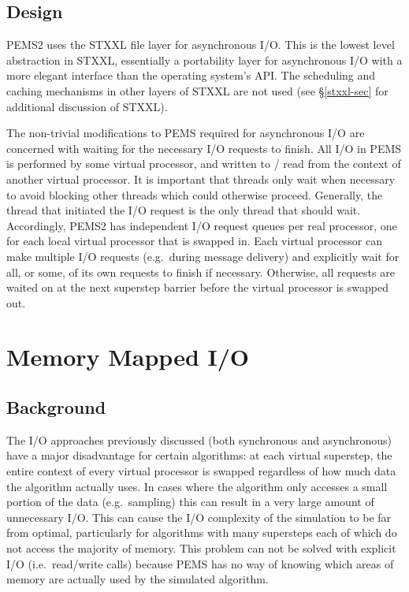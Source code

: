 \documentclass[12pt]{carletoncsthesis}
\begin{document}
\subsection{Design}


PEMS2 uses the STXXL \cite{stxxl} file layer for asynchronous I/O.  This is
the lowest level abstraction in STXXL, essentially a portability layer for
asynchronous I/O with a more elegant interface than the operating system's API.
The scheduling and caching mechanisms in other layers of STXXL are not used
(see \S\ref{stxxl-sec} for additional discussion of STXXL).

The non-trivial modifications to PEMS required for asynchronous I/O are
concerned with waiting for the necessary I/O requests to finish.  All I/O in
PEMS is performed by some virtual processor, and written to / read from the
context of another virtual processor.  It is important that threads only wait
when necessary to avoid blocking other threads which could otherwise proceed.
Generally, the thread that initiated the I/O request is the only thread that
should wait.  Accordingly, PEMS2 has  independent I/O request queues per
real processor, one for each local virtual processor that is swapped in.
Each virtual processor can make multiple I/O requests (e.g.\ during message
delivery) and explicitly wait for all, or some, of its own requests to finish
if necessary.  Otherwise, all requests are waited on at the next superstep
barrier before the virtual processor is swapped out.

\section{Memory Mapped I/O}
\label{mmap}


\subsection{Background}


The I/O approaches previously discussed (both synchronous and asynchronous)
have a major disadvantage for certain algorithms: at each virtual superstep,
the entire context of every virtual processor is swapped regardless of how
much data the algorithm actually uses.  In cases where the algorithm only
accesses a small portion of the data (e.g.\ sampling) this can result in a
very large amount of unnecessary I/O.  This can cause the I/O complexity
of the simulation to be far from optimal, particularly for algorithms
with many supersteps each of which do not access the majority of memory.
This problem can not be solved with explicit I/O (i.e.\ read/write calls)
because PEMS has no way of knowing which areas of memory are actually used
by the simulated algorithm.
\end{document}
